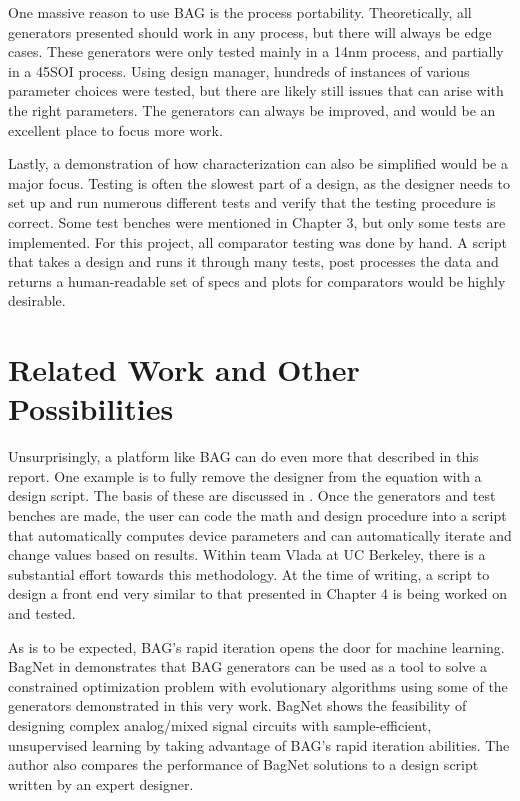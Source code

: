 One massive reason to use BAG is the process portability. Theoretically, all generators presented should work in any process, but there will always be edge cases. These generators were only tested mainly in a 14nm process, and partially in a 45SOI process. Using design manager, hundreds of instances of various parameter choices were tested, but there are likely still issues that can arise with the right parameters. The generators can always be improved, and would be an excellent place to focus more work.

Lastly, a demonstration of how characterization can also be simplified would be a major focus. Testing is often the slowest part of a design, as the designer needs to set up and run numerous different tests and verify that the testing procedure is correct. Some test benches were mentioned in Chapter 3, but only some tests are implemented. For this project, all comparator testing was done by hand. A script that takes a design and runs it through many tests, post processes the data and returns a human-readable set of specs and plots for comparators would be highly desirable. 
\section{Related Work and Other Possibilities}
Unsurprisingly, a platform like BAG can do even more that described in this report. One example is to fully remove the designer from the equation with a design script. The basis of these are discussed in \cite{chang_bag2:_2018}. Once the generators and test benches are made, the user can code the math and design procedure into a script that automatically computes device parameters and can automatically iterate and change values based on results. Within team Vlada at UC Berkeley, there is a substantial effort towards this methodology. At the time of writing, a script to design a front end very similar to that presented in Chapter 4 is being worked on and tested.

As is to be expected, BAG's rapid iteration opens the door for machine learning. BagNet in \cite{hakhamaneshi_late_nodate} demonstrates that BAG generators can be used as a tool to solve a constrained optimization problem with evolutionary algorithms using some of the generators demonstrated in this very work. BagNet shows the feasibility of designing complex analog/mixed signal circuits with sample-efficient, unsupervised learning by taking advantage of BAG's rapid iteration abilities. The author also compares the performance of BagNet solutions to a design script written by an expert designer.